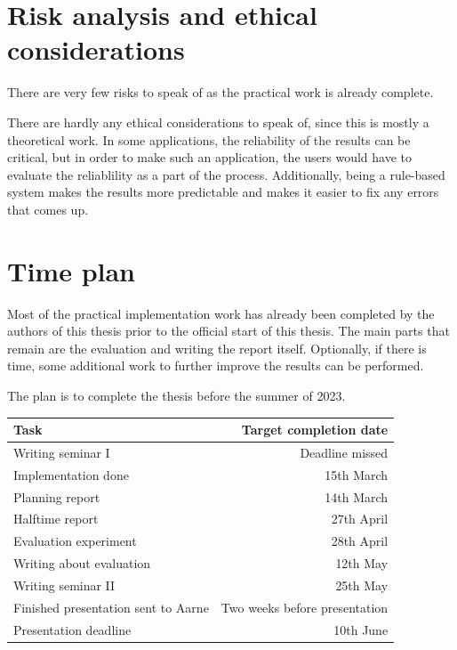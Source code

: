 \documentclass{article}
\begin{document}


\section{Risk analysis and ethical considerations}
There are very few risks to speak of as the practical work is already complete.

There are hardly any ethical considerations to speak of, since this is mostly a theoretical work. In some applications, the reliability of the results can be critical, but in  order to make such an application, the users would have to evaluate the reliablility as a part of the process. Additionally, being a rule-based system makes the results more predictable and makes it easier to fix any errors that comes up.




\section{Time plan}
Most of the practical implementation work has already been completed by the authors of this thesis prior to the official start of this thesis.
The main parts that remain are the evaluation and writing the report itself. Optionally, if there is time, some additional work to further improve the results can be performed.

The plan is to complete the thesis before the summer of 2023.

\begin{tabular}{|l|r|}
    \hline
    Task & Target completion date \\
    \hline
    Writing seminar I & Deadline missed \\
    Implementation done & 15th March \\
    Planning report & 14th March \\
    Halftime report & 27th April \\
    Evaluation experiment & 28th April \\
    Writing about evaluation & 12th May \\
    Writing seminar II & 25th May \\
    Finished presentation sent to Aarne & Two weeks before presentation \\
    Presentation deadline & 10th June \\
    \hline
\end{tabular}
\end{document}

